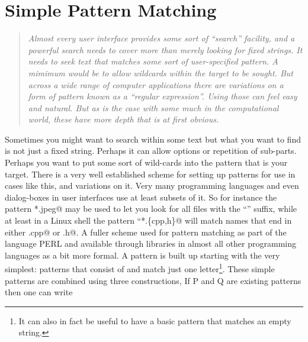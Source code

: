 \section{Simple Pattern Matching}
\begin{quotation}\textit{
Almost every user interface provides some sort of ``search'' facility,
and a powerful search needs to cover more than merely looking
for fixed strings. It needs to seek text that matches some sort of
user-specified pattern. A mimimum would be to allow wildcards within
the target to be sought. But across a wide range of computer applications
there are variations on a form of pattern known as a ``regular expression''.
Using those can feel easy and natural. But as is the case with some much
in the computational world, these have more depth that is at first obvious.
}\end{quotation}
Sometimes you might want to search within some text but what you want to
find is not just a fixed string. Perhaps it can allow options or
repetition of sub-parts. Perhaps you want to put some sort of wild-cards
into the pattern that is your target. There is a very well established
scheme for setting up patterns for use in cases like this, and variations on
it. Very many programming languages and even dialog-boxes in user interfaces
use at least subsets of it. So for instance the pattern \verb@*.jpeg@ may
be used to let you look for all files with the ``\verb@jpeg@'' suffix,
while at least in a Linux shell the pattern ``\verb@*.\{cpp,h\}@ will match
names that end in either \verb@.cpp@ or \verb@.h@. A fuller scheme used for
pattern matching as part of the language PERL and available through libraries
in almost all other programming languages as a bit more formal. A
pattern is built up starting with the very simplest: patterns that
consist of and match just one letter\footnote{It can also in fact be
useful to have a basic pattern that matches an empty string.}. These
simple patterns are combined using three constructions, If P and Q are
existing patterns then one can write

